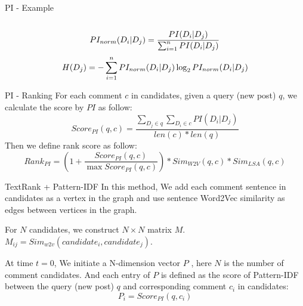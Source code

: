 \documentclass[aspectratio=169]{beamer}
\newcommand\Fontvi{\fontsize{8}{7.2}\selectfont}
\begin{document}
\begin{frame}{PI - Example}
\begin{columns}[T]
\begin{column}{.48\textwidth}
        
      \end{column}%

      \end{columns}
      
      \begin{equation}
      \Fontvi
      PI_{norm}(D_i|D_j) = \frac{PI(D_i|D_j)}{\sum_{i=1}^n{PI(D_i|D_j)}}
      \end{equation}
      \begin{equation}
      \Fontvi
      H(D_j) = - \sum_{i=1}^n{PI_{norm}(D_i|D_j)\log_2{PI_{norm}(D_i|D_j)}}
      \end{equation}

    \end{frame}

    \begin{frame}{PI - Ranking}
      For each comment $c$ in candidates, given a query (new post) $q$, we 
      calculate the score by $PI$ as follow:
      \begin{equation}
        Score_{PI}(q, c) = \frac{\sum_{D_j \in q}{\sum_{D_i \in c}{PI(D_i|D_j)}}}{len(c) * len(q)}
      \end{equation}
      Then we define rank score as follow:
      \begin{equation}
        Rank_{PI} = (1 + \frac{Score_{PI}(q, c)}{\max{Score_{PI}(q, c)}}) * Sim_{W2V}(q, c)*Sim_{LSA}(q, c)  
      \end{equation}
    \end{frame}

    \begin{frame}{TextRank + Pattern-IDF}
      In this method, We add each comment sentence in candidates as a vertex in the graph and use sentence Word2Vec similarity as edges between vertices in the graph.

      For $N$ candidates, we construct $ N \times N $ matrix $M$. $M_{ij} = Sim_{w2v}(candidate_i, candidate_j)$. 

      At time $t = 0$, We initiate a N-dimension vector $P$ , here $N$ is the number 
      of comment candidates. And each entry of $P$ is defined as the score of Pattern-IDF between the query (new post) $q$ and corresponding comment $c_i$ in candidates:
      \begin{equation}
        P_i = Score_{PI}(q, c_i)
      \end{equation}
    \end{frame}
\end{document}
